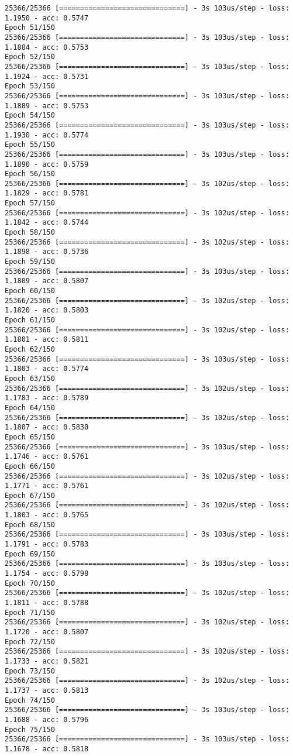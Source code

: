 \documentclass[11pt]{article}
\begin{document}
\begin{Verbatim}[commandchars=\\\{\}]
25366/25366 [==============================] - 3s 103us/step - loss: 1.1950 - acc: 0.5747
Epoch 51/150
25366/25366 [==============================] - 3s 103us/step - loss: 1.1884 - acc: 0.5753
Epoch 52/150
25366/25366 [==============================] - 3s 103us/step - loss: 1.1924 - acc: 0.5731
Epoch 53/150
25366/25366 [==============================] - 3s 103us/step - loss: 1.1889 - acc: 0.5753
Epoch 54/150
25366/25366 [==============================] - 3s 103us/step - loss: 1.1930 - acc: 0.5774
Epoch 55/150
25366/25366 [==============================] - 3s 103us/step - loss: 1.1890 - acc: 0.5759
Epoch 56/150
25366/25366 [==============================] - 3s 102us/step - loss: 1.1829 - acc: 0.5781
Epoch 57/150
25366/25366 [==============================] - 3s 102us/step - loss: 1.1842 - acc: 0.5744
Epoch 58/150
25366/25366 [==============================] - 3s 102us/step - loss: 1.1898 - acc: 0.5736
Epoch 59/150
25366/25366 [==============================] - 3s 103us/step - loss: 1.1809 - acc: 0.5807
Epoch 60/150
25366/25366 [==============================] - 3s 102us/step - loss: 1.1820 - acc: 0.5803
Epoch 61/150
25366/25366 [==============================] - 3s 102us/step - loss: 1.1801 - acc: 0.5811
Epoch 62/150
25366/25366 [==============================] - 3s 103us/step - loss: 1.1803 - acc: 0.5774
Epoch 63/150
25366/25366 [==============================] - 3s 102us/step - loss: 1.1783 - acc: 0.5789
Epoch 64/150
25366/25366 [==============================] - 3s 102us/step - loss: 1.1807 - acc: 0.5830
Epoch 65/150
25366/25366 [==============================] - 3s 103us/step - loss: 1.1746 - acc: 0.5761
Epoch 66/150
25366/25366 [==============================] - 3s 102us/step - loss: 1.1771 - acc: 0.5761
Epoch 67/150
25366/25366 [==============================] - 3s 102us/step - loss: 1.1803 - acc: 0.5765
Epoch 68/150
25366/25366 [==============================] - 3s 103us/step - loss: 1.1791 - acc: 0.5783
Epoch 69/150
25366/25366 [==============================] - 3s 103us/step - loss: 1.1754 - acc: 0.5798
Epoch 70/150
25366/25366 [==============================] - 3s 102us/step - loss: 1.1811 - acc: 0.5788
Epoch 71/150
25366/25366 [==============================] - 3s 102us/step - loss: 1.1720 - acc: 0.5807
Epoch 72/150
25366/25366 [==============================] - 3s 102us/step - loss: 1.1733 - acc: 0.5821
Epoch 73/150
25366/25366 [==============================] - 3s 102us/step - loss: 1.1737 - acc: 0.5813
Epoch 74/150
25366/25366 [==============================] - 3s 103us/step - loss: 1.1688 - acc: 0.5796
Epoch 75/150
25366/25366 [==============================] - 3s 103us/step - loss: 1.1678 - acc: 0.5818

\end{Verbatim}
\end{document}
